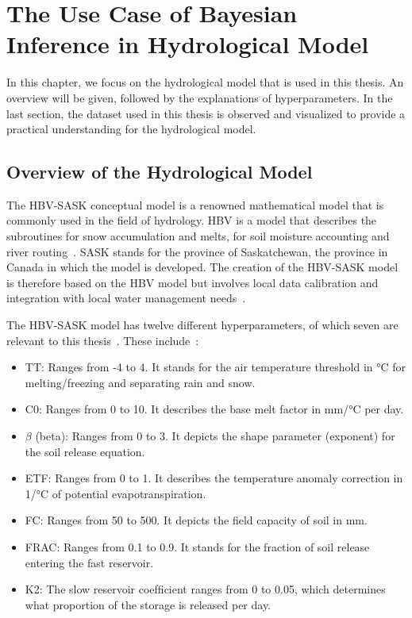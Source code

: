 \chapter{The Use Case of Bayesian Inference in Hydrological Model}

In this chapter, we focus on the hydrological model that is used in this thesis. An overview will be given, followed by the explanations of hyperparameters. In the last section, the dataset used in this thesis is observed and visualized to provide a practical understanding for the hydrological model.


\section{Overview of the Hydrological Model}
The HBV-SASK conceptual model is a renowned mathematical model that is commonly used in the field of hydrology. HBV is a model that describes the subroutines for snow accumulation and melts, for soil moisture accounting and river routing~\cite{hbv}. SASK stands for the province of Saskatchewan, the province in Canada in which the model is developed. The creation of the HBV-SASK model is therefore based on the HBV model but involves local data calibration and integration with local water management needs~\cite{sask}.

The HBV-SASK model has twelve different hyperparameters, of which seven are relevant to this thesis~\cite{ivana_relevant_params}. These include~\cite{hydrology}:

\begin{itemize}
  \item TT: Ranges from -4 to 4. It stands for the air temperature threshold in °C for melting/freezing and separating rain and snow.
  \item C0: Ranges from 0 to 10. It describes the base melt factor in mm/°C per day.
  \item $\beta$ (beta): Ranges from 0 to 3. It depicts the shape parameter (exponent) for the soil release equation.
  \item ETF: Ranges from 0 to 1. It describes the temperature anomaly correction in 1/°C of potential evapotranspiration.
  \item FC: Ranges from 50 to 500. It depicts the field capacity of soil in mm.
  \item FRAC: Ranges from 0.1 to 0.9. It stands for the fraction of soil release entering the fast reservoir.
  \item K2: The slow reservoir coefﬁcient ranges from 0 to 0.05, which determines what proportion of the storage is released per day.
\end{itemize}

